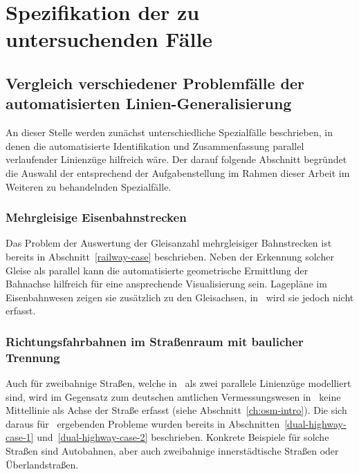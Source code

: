 \documentclass[../main/thesis.tex]{subfiles}
\begin{document}
\chapter{Spezifikation der zu untersuchenden Fälle}




\section[Vergleich verschiedener Fälle der automatisierten Linien-Generalisierung]{Vergleich verschiedener Problemfälle der au\-to\-ma\-ti\-sier\-ten Linien-Ge\-ne\-ra\-li\-sie\-rung}
\label{ch:case-comparison}

An dieser Stelle werden zunächst unterschiedliche Spezialfälle beschrieben, in denen die automatisierte Identifikation und Zusammenfassung parallel verlaufender Linienzüge hilfreich wäre.
Der darauf folgende Abschnitt begründet die Auswahl der entsprechend der Aufgabenstellung im Rahmen dieser Arbeit im Weiteren zu behandelnden Spezialfälle.



\subsection{Mehrgleisige Eisenbahnstrecken}

Das Problem der Auswertung der Gleisanzahl mehrgleisiger Bahnstrecken ist bereits in Abschnitt~\ref{railway-case} beschrieben.
Neben der Erkennung solcher Gleise als parallel kann die automatisierte geometrische Ermittlung der Bahnachse hilfreich für eine ansprechende Visualisierung sein.
Lagepläne im Eisenbahnwesen zeigen sie zusätzlich zu den Gleisachsen, in \osm\ wird sie jedoch nicht erfasst.




\subsection{Richtungsfahrbahnen im Straßenraum mit baulicher Trennung}
\label{ch:dual-highway-case-desc}

Auch für zweibahnige Straßen, welche in \osm\ als zwei parallele Linienzüge modelliert sind, wird im Gegensatz zum deutschen amtlichen Vermessungswesen in \osm\ keine Mittellinie als Achse der Straße erfasst (siehe Abschnitt~\ref{ch:osm-intro}).
Die sich daraus für \osm\ ergebenden Probleme wurden bereits in Abschnitten~\ref{dual-highway-case-1} und~\ref{dual-highway-case-2} beschrieben.
Konkrete Beispiele für solche Straßen sind Autobahnen, aber auch zweibahnige innerstädtische Straßen oder Überlandstraßen.
\end{document}
